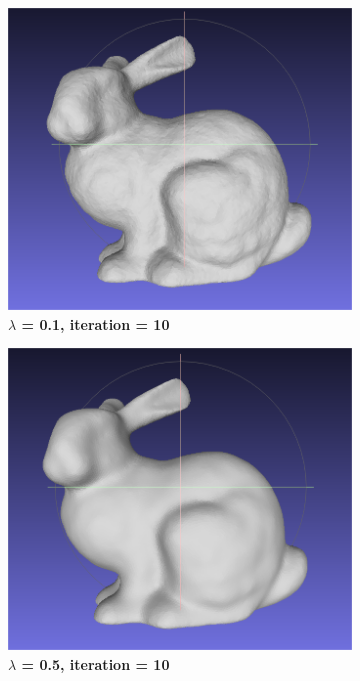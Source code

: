 \documentclass{ctexart}
\begin{document}
\begin{figure}[htbp]
    \centering
    \begin{subfigure}[htbp]{0.24\linewidth}
        \centering
        \includegraphics[width=0.9\linewidth]{figures/1.png}
        \caption{\textbf{$\lambda$ = 0.1, iteration = 10}}
    \end{subfigure}
    \begin{subfigure}[htbp]{0.24\linewidth}
        \centering
        \includegraphics[width=0.9\linewidth]{figures/5.png}
        \caption{\textbf{$\lambda$ = 0.5, iteration = 10}}
    \end{subfigure}
    \begin{subfigure}[htbp]{0.24\linewidth}

\end{subfigure}
\end{figure}
\end{document}
